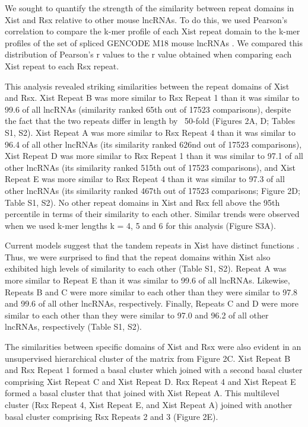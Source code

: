 We sought to quantify the strength of the similarity between repeat domains in Xist and Rsx relative to other mouse lncRNAs. To do this, we used Pearson’s correlation to compare the k-mer profile of each Xist repeat domain to the k-mer profiles of the set of spliced GENCODE M18 mouse lncRNAs \cite{Derrien2012TheExpression}. We compared this distribution of Pearson’s r values to the r value obtained when comparing each Xist repeat to each Rsx repeat. 

This analysis revealed striking similarities between the repeat domains of Xist and Rsx. Xist Repeat B was more similar to Rsx Repeat 1 than it was similar to 99.6 of all lncRNAs (similarity ranked 65th out of 17523 comparisons), despite the fact that the two repeats differ in length by ~50-fold (Figures 2A, D; Tables S1, S2). Xist Repeat A was more similar to Rsx Repeat 4 than it was similar to 96.4 of all other lncRNAs (its similarity ranked 626nd out of 17523 comparisons), Xist Repeat D was more similar to Rsx Repeat 1 than it was similar to 97.1 of all other lncRNAs (its similarity ranked 515th out of 17523 comparisons), and Xist Repeat E was more similar to Rsx Repeat 4 than it was similar to 97.3 of all other lncRNAs (its similarity ranked 467th out of 17523 comparisons; Figure 2D; Table S1, S2). No other repeat domains in Xist and Rsx fell above the 95th percentile in terms of their similarity to each other. Similar trends were observed when we used k-mer lengths k = 4, 5 and 6 for this analysis (Figure S3A). 

Current models suggest that the tandem repeats in Xist have distinct functions \cite{Balaton2018TheChromosome,Brockdorff2018LocalNcRNA,DaRocha2017NovelConformation,Sahakyan2018TheCompensation}. Thus, we were surprised to find that the repeat domains within Xist also exhibited high levels of similarity to each other (Table S1, S2). Repeat A was more similar to Repeat E than it was similar to 99.6 of all lncRNAs. Likewise, Repeats B and C were more similar to each other than they were similar to 97.8 and 99.6 of all other lncRNAs, respectively. Finally, Repeats C and D were more similar to each other than they were similar to 97.0 and 96.2 of all other lncRNAs, respectively (Table S1, S2). 

The similarities between specific domains of Xist and Rsx were also evident in an unsupervised hierarchical cluster of the matrix from Figure 2C. Xist Repeat B and Rsx Repeat 1 formed a basal cluster which joined with a second basal cluster comprising Xist Repeat C and Xist Repeat D.   Rsx Repeat 4 and Xist Repeat E formed a basal cluster that that joined with Xist Repeat A. This multilevel cluster (Rsx Repeat 4, Xist Repeat E, and Xist Repeat A) joined with another basal cluster comprising Rsx Repeats 2 and 3 (Figure 2E). 

